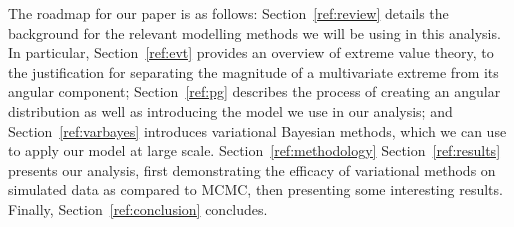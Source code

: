 The roadmap for our paper is as follows:  Section~\ref{ref:review} details the 
    background for the relevant modelling methods
    we will be using in this analysis.  In particular, Section~\ref{ref:evt} 
    provides an overview of extreme value theory, to the justification for 
    separating the magnitude of a multivariate extreme from its angular 
    component; Section~\ref{ref:pg} describes the process of creating an angular 
    distribution as well as introducing the model we use in our analysis; and 
    Section~\ref{ref:varbayes} introduces variational Bayesian methods, which we 
    can use to apply our model at large scale.  Section~\ref{ref:methodology} 
    Section~\ref{ref:results} presents our analysis, first demonstrating the 
    efficacy of variational methods on simulated data as compared to MCMC, then
    presenting some interesting results. Finally, Section~\ref{ref:conclusion} 
    concludes.

